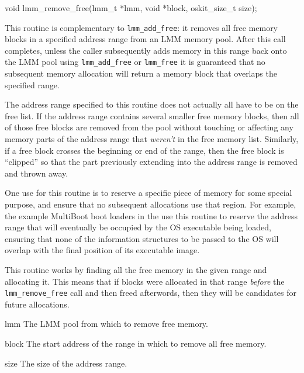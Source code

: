 \begin{apisyn}

	\funcproto void lmm_remove_free(lmm_t *lmm,
		void *block, oskit_size_t size);
\end{apisyn}
\begin{apidesc}
	This routine is complementary to {\tt lmm_add_free}:
	it removes all free memory blocks in a specified address range
	from an LMM memory pool.
	After this call completes,
	unless the caller subsequently adds memory in this range
	back onto the LMM pool using {\tt lmm_add_free} or {\tt lmm_free}
	it is guaranteed that no subsequent memory allocation
	will return a memory block that overlaps the specified range.

	The address range specified to this routine
	does not actually all have to be on the free list.
	If the address range contains several smaller free memory blocks,
	then all of those free blocks are removed from the pool
	without touching or affecting any memory parts of the address range
	that \emph{weren't} in the free memory list.
	Similarly, if a free block crosses the beginning or end of the range,
	then the free block is ``clipped''
	so that the part previously extending into the address range
	is removed and thrown away.

	One use for this routine
	is to reserve a specific piece of memory for some special purpose,
	and ensure that no subsequent allocations use that region.
	For example, the example MultiBoot boot loaders in the \oskit{}
	use this routine to reserve the address range
	that will eventually be occupied by the OS executable being loaded,
	ensuring that none of the information structures to be passed to the OS
	will overlap with the final position of its executable image.

	This routine works by finding all the free memory in the given
	range and allocating it.
	This means that if blocks were allocated in that range \emph{before}
	the \texttt{lmm_remove_free} call and then freed afterwords,
	then they will be candidates for future allocations.
\end{apidesc}
\begin{apiparm}
	\item[lmm]
		The LMM pool from which to remove free memory.
	\item[block]
		The start address of the range
		in which to remove all free memory.
	\item[size]
		The size of the address range.
\end{apiparm}

